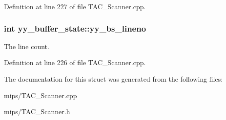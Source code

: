 Definition at line 227 of file T\-A\-C\-\_\-\-Scanner.\-cpp.

\hypertarget{structyy__buffer__state_a818e94bc9c766e683c60df1e9fd01199}{
\subsubsection[{yy\-\_\-bs\-\_\-lineno}]{\setlength{\rightskip}{0pt plus 5cm}int yy\-\_\-buffer\-\_\-state\-::yy\-\_\-bs\-\_\-lineno}}\label{structyy__buffer__state_a818e94bc9c766e683c60df1e9fd01199}


The line count. 



Definition at line 226 of file T\-A\-C\-\_\-\-Scanner.\-cpp.



The documentation for this struct was generated from the following files\-:\begin{DoxyCompactItemize}
\item 
mips/T\-A\-C\-\_\-\-Scanner.\-cpp\item 
mips/T\-A\-C\-\_\-\-Scanner.\-h\end{DoxyCompactItemize}
